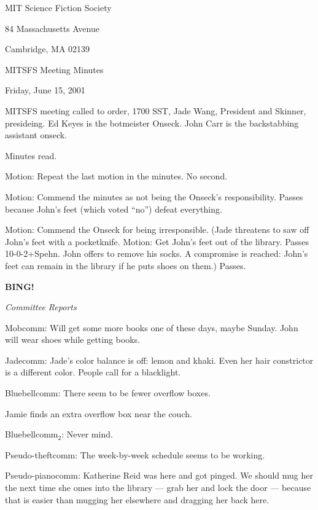 \documentclass[12pt]{article}
\newcommand{\bing}{{\bf BING!} }
\newcommand{\goto}[1]{\bing \vskip 12pt \centerline{{\em{#1}}}}
\begin{document}
\begin{center}

MIT Science Fiction Society 

84 Massachusetts Avenue

Cambridge, MA 02139

\vspace{12pt}

MITSFS Meeting Minutes 

Friday, June 15, 2001

\end{center}
 
\vspace{18pt}

\setlength{\parskip}{6pt}

\noindent
MITSFS meeting called to order, 1700 SST, Jade Wang, President and Skinner,
presideing.  Ed Keyes is the botmeister Onseck.  John Carr is the
backstabbing assistant onseck.

Minutes read.

Motion: Repeat the last motion in the minutes.  No second.

Motion: Commend the minutes as not being the Onseck's responsibility.
Passes because John's feet (which voted ``no'') defeat everything.

Motion: Commend the Onseck for being irresponsible.
(Jade threatens to saw off John's feet with a pocketknife.
Motion: Get John's feet out of the library.  Passes \hbox{10-0-2+Spehn}.
John offers to remove his socks.  A compromise is reached: John's feet
can remain in the library if he puts shoes on them.)
Passes.

\goto{Committee Reports}

Mobcomm: Will get some more books one of these days, maybe Sunday.
John will wear shoes while getting books.

Jadecomm: Jade's color balance is off: lemon and khaki.
Even her hair constrictor is a different color.  People
call for a blacklight.

Bluebellcomm: There seem to be fewer overflow boxes.

Jamie finds an extra overflow box near the couch.

Bluebellcomm$_2$: Never mind.

Pseudo-theftcomm: The week-by-week schedule seems to be working.

Pseudo-pianocomm: Katherine Reid was here and got pinged.  We should
mug her the next time she omes into the library --- grab her and lock
the door --- because that is easier than mugging her elsewhere and
dragging her back here.
\end{document}
